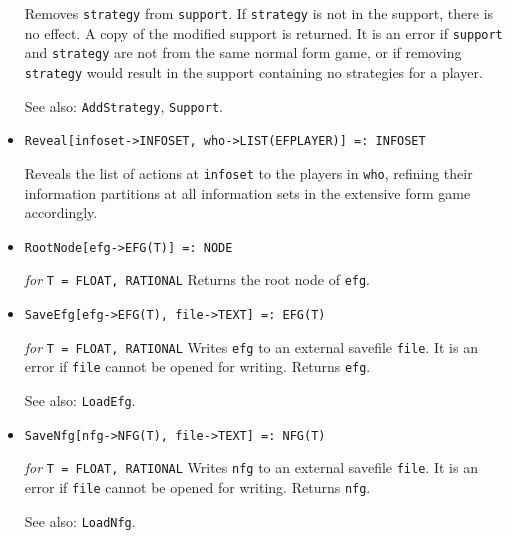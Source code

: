 \begin{itemize}
\bd
Removes \verb+strategy+ from \verb+support+.  If \verb+strategy+ is not in
the support, there is no effect.  A copy of the modified support is
returned.  It is an error if \verb+support+ and \verb+strategy+ are
not from the same normal form game, or if removing \verb+strategy+
would result in the support containing no strategies for a player.
\item [See also:] \verb+AddStrategy+, \verb+Support+.
\ed

\item{}
\protect \large \begin{verbatim}
Reveal[infoset->INFOSET, who->LIST(EFPLAYER)] =: INFOSET
\end{verbatim}\normalsize

\bd
Reveals the list of actions at \verb+infoset+ to the players in \verb+who+,
refining their information partitions at
all information sets in the extensive form game accordingly.  
\ed

\item{}
\protect \large \begin{verbatim}
RootNode[efg->EFG(T)] =: NODE
\end{verbatim}\normalsize

{\it for} {\tt T = FLOAT, RATIONAL}
\bd
Returns the root node of \verb+efg+.
\ed


\item{}
\protect \large \begin{verbatim}
SaveEfg[efg->EFG(T), file->TEXT] =: EFG(T)
\end{verbatim}\normalsize

{\it for} {\tt T = FLOAT, RATIONAL}
\bd
Writes \verb+efg+ to an external savefile \verb+file+.  It is an error
if \verb+file+ cannot be opened for writing.  Returns \verb+efg+.
\item [See also:] \verb+LoadEfg+.
\ed

\item{}
\protect \large \begin{verbatim}
SaveNfg[nfg->NFG(T), file->TEXT] =: NFG(T)
\end{verbatim}\normalsize

{\it for} {\tt T = FLOAT, RATIONAL}
\bd
Writes \verb+nfg+ to an external savefile \verb+file+.  It is an
error if \verb+file+ cannot be opened for writing.  Returns \verb+nfg+.
\item [See also:] \verb+LoadNfg+.
\ed


\end{itemize}
